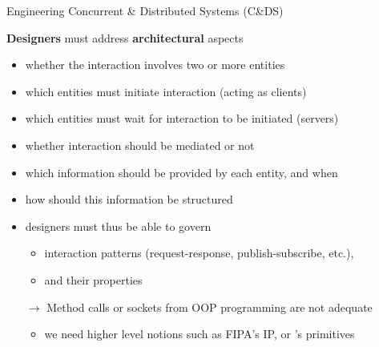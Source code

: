 \documentclass[presentation]{beamer}\mode<presentation>{\usetheme{AMSCesenaPurpleAndGold}}
\begin{document}
\begin{frame}[c,allowframebreaks]{Engineering Concurrent \& Distributed Systems (C\&DS)}
	\framebreak

	\begin{block}{\textbf{Designers} must address \textbf{architectural} aspects}
		\begin{itemize}
			\item whether the interaction involves \alert{two or more} entities
			\item which entities must \alert{initiate} interaction (acting as clients)
			\item which entities must \alert{wait} for interaction to be initiated (servers)
			\item whether interaction should be \alert{mediated} or not
			\item which information should be provided by each entity, and \alert{when}
			\item how should this information be \alert{structured}
		\end{itemize}
	\end{block}

	\bigskip

	\begin{itemize}
		\item designers must thus be able to govern
		\begin{itemize}
			\item interaction patterns (request-response, publish-subscribe, etc.),
			\item and their properties
		\end{itemize}

		\bigskip

		\item[$\rightarrow$] Method calls or sockets from OOP programming are not adequate
		\begin{itemize}
			\item we need higher level notions such as \alert{FIPA's IP}, or \alert{\linda{}'s primitives}
		\end{itemize}
	\end{itemize}

	\framebreak


\end{frame}
\end{document}
